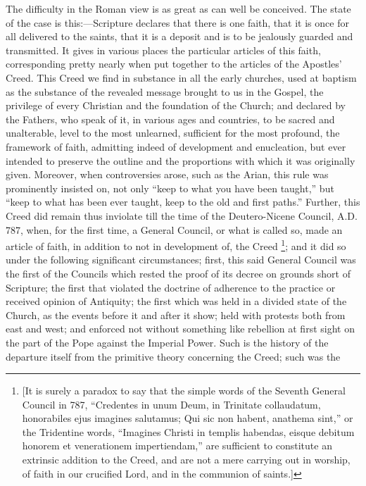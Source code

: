 The difficulty in the Roman view is as great as
can well be conceived. The state of the case is this:—Scripture
declares that there is one faith, that it is once for all delivered to
the saints, that it is a deposit and is to be jealously guarded and
transmitted. It gives in various places the particular articles of
this faith, corresponding pretty nearly when put together to the
articles of the Apostles' Creed. This Creed we find in substance in all the early churches, used at baptism as the substance of the
revealed message brought to us in the Gospel, the privilege of every
Christian and the foundation of the Church; and declared by the
Fathers, who speak of it, in various ages and countries, to be sacred
and unalterable, level to the most unlearned, sufficient for the most
profound, the framework of faith, admitting indeed of development and
enucleation, but ever intended to preserve the outline and the
proportions with which it was originally given. Moreover, when
controversies arose, such as the Arian, this rule was prominently
insisted on, not only ``keep to what you have been taught,'' but ``keep
to what has been ever taught, keep to the old and first paths.''
Further, this Creed did remain thus inviolate till the time of the
Deutero-Nicene Council, A.D. 787, when, for the first time, a General
Council, or what is called so, made an article of faith, in addition
to not in development of, the Creed \footnote{[It is surely a paradox to say that the simple
words of the Seventh General Council in 787, ``Credentes in unum Deum,
in Trinitate collaudatum, honorabiles ejus imagines salutamus; Qui sic
non habent, anathema sint,'' or the Tridentine words, ``Imagines Christi
in templis habendas, eisque debitum honorem et venerationem
impertiendam,'' are sufficient to constitute an extrinsic addition to
the Creed, and are not a mere carrying out in worship, of faith in our
crucified Lord, and in the communion of saints.]}; and it did so under the following significant circumstances;
first, this said General Council was the first of the Councils which
rested the proof of its decree on grounds short of Scripture; the
first that violated the doctrine of adherence to the practice or
received opinion of Antiquity; the first which was held in a divided
state of the Church, as the events before it and after it show; held
with protests both from east and west; and enforced not without
something like rebellion at first sight on the part of the Pope
against the Imperial Power. Such is the history of the departure
itself from the primitive theory concerning the Creed; such was the
